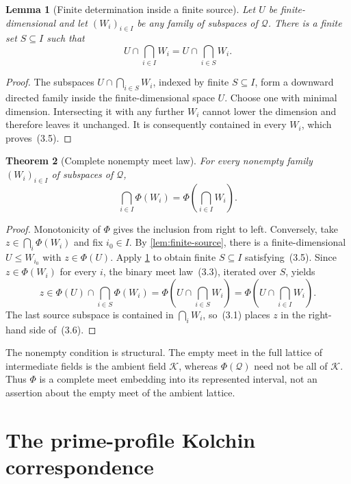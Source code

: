 \documentclass[11pt]{article}
\newtheorem{theorem}{Theorem}[section]
\newtheorem{lemma}[theorem]{Lemma}
\theoremstyle{definition}
\theoremstyle{remark}
\newcommand{\K}{\mathcal K}
\newcommand{\Q}{\mathcal Q}
\begin{document}
\begin{lemma}[Finite determination inside a finite source]\label{lem:finite-determination}
Let $U$ be finite-dimensional and let $(W_i)_{i\in I}$ be any family of subspaces of $\Q$.  There
is a finite set $S\subseteq I$ such that
\[
  U\cap\bigcap_{i\in I}W_i=U\cap\bigcap_{i\in S}W_i.           \tag{3.5}
\]
\end{lemma}

\begin{proof}
The subspaces $U\cap\bigcap_{i\in S}W_i$, indexed by finite $S\subseteq I$, form a downward
directed family inside the finite-dimensional space $U$.  Choose one with minimal dimension.
Intersecting it with any further $W_i$ cannot lower the dimension and therefore leaves it
unchanged.  It is consequently contained in every $W_i$, which proves~(3.5).
\end{proof}

\begin{theorem}[Complete nonempty meet law]\label{thm:complete-meet}
For every nonempty family $(W_i)_{i\in I}$ of subspaces of $\Q$,
\[
  \bigcap_{i\in I}\Phi(W_i)=\Phi\!\left(\bigcap_{i\in I}W_i\right). \tag{3.6}
\]
\end{theorem}

\begin{proof}
Monotonicity of $\Phi$ gives the inclusion from right to left.  Conversely, take
$z\in\bigcap_i\Phi(W_i)$ and fix $i_0\in I$.  By \cref{lem:finite-source}, there is a
finite-dimensional $U\leq W_{i_0}$ with $z\in\Phi(U)$.  Apply
\cref{lem:finite-determination} to obtain finite $S\subseteq I$ satisfying~(3.5).  Since
$z\in\Phi(W_i)$ for every $i$, the binary meet law~(3.3), iterated over $S$, yields
\[
  z\in\Phi(U)\cap\bigcap_{i\in S}\Phi(W_i)
   =\Phi\!\left(U\cap\bigcap_{i\in S}W_i\right)
   =\Phi\!\left(U\cap\bigcap_{i\in I}W_i\right).
\tag{3.7}
\]
The last source subspace is contained in $\bigcap_iW_i$, so~(3.1) places $z$ in the right-hand
side of~(3.6).
\end{proof}

The nonempty condition is structural.  The empty meet in the full lattice of intermediate fields
is the ambient field $\K$, whereas $\Phi(\Q)$ need not be all of $\K$.  Thus $\Phi$ is a complete
meet embedding into its represented interval, not an assertion about the empty meet of the
ambient lattice.

\section{The prime-profile Kolchin correspondence}\label{sec:kolchin}
\end{document}
